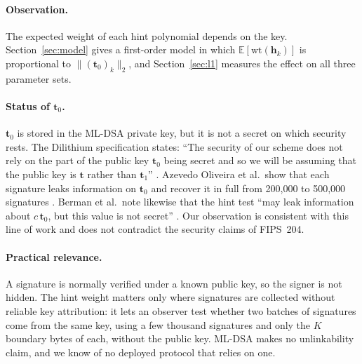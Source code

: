 \documentclass{article}
\newcommand{\hint}{\mathbf{h}}
\newcommand{\tzero}{\mathbf{t}_0}
\newcommand{\tone}{\mathbf{t}_1}
\newcommand{\wt}[1]{\mathrm{wt}(#1)}
\begin{document}
\paragraph{Observation.}
The expected weight of each hint polynomial depends on the key.  Section~\ref{sec:model}
gives a first-order model in which
$\mathbb{E}[\wt{\hint_k}]$ is proportional to $\|(\tzero)_k\|_2$, and
Section~\ref{sec:l1} measures the effect on all three parameter sets.

\paragraph{Status of $\tzero$.}
$\tzero$ is stored in the ML-DSA private key, but it is not a secret on which
security rests.  The Dilithium specification states: ``The security of our
scheme does not rely on the part of the public key $\tzero$ being secret and so
we will be assuming that the public key is $\mathbf{t}$ rather than $\tone$''
\cite[Appendix~B]{dilithium2021spec}.  Azevedo Oliveira et al.\ show that each
signature leaks information on $\tzero$ and recover it in full from 200,000 to
500,000 signatures \cite{azevedo2024uncompressing}.  Berman et al.\ note
likewise that the hint test ``may leak information about $c\,\tzero$, but this
value is not secret'' \cite[Section~2.4]{berman2024note}.
Our observation is consistent with this line of work and does not contradict
the security claims of FIPS~204.

\paragraph{Practical relevance.}
A signature is normally verified under a known public key, so the signer is
not hidden.  The hint weight matters only where signatures are collected
without reliable key attribution: it lets an observer test whether two batches
of signatures come from the same key, using a few thousand signatures and only
the $K$ boundary bytes of each, without the public key.
ML-DSA makes no unlinkability claim, and we know of no deployed protocol that
relies on one.
\end{document}
